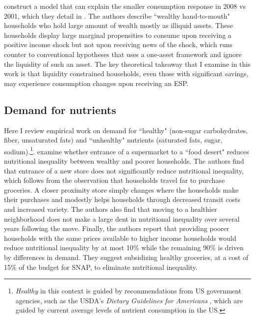\documentclass[12pt]{article}
\begin{document}
\textcite{kaplan2014model} construct a model that can explain the smaller consumption response in 2008 vs 2001, which they detail in \textcite{kaplan2014tale}. The authors describe ``wealthy hand-to-mouth" households who hold large amount of wealth mostly as illiquid assets. These households display large marginal propensities to consume upon receiving a positive income shock but not upon receiving news of the shock, which runs counter to conventional hypotheses that uses a one-asset framework and ignore the liquidity of such an asset. The key theoretical takeaway that I examine in this work is that liquidity constrained households, even those with significant savings, may experience consumption changes upon receiving an ESP.

\subsection{Demand for nutrients}

Here I review empirical work on demand for ``healthy" (non-sugar carbohydrates, fiber, unsaturated fats) and ``unhealthy" nutrients (saturated fats, sugar, sodium).\footnote{\textit{Healthy} in this context is guided by recommendations from US government agencies, such as the USDA's \textit{Dietary Guidelines for Americans} \citeyear{usda2021}, which are guided by current average levels of nutrient consumption in the US.}. \textcite{allcott2019food} examine whether entrance of a supermarket to a ``food desert" reduces nutritional inequality between wealthy and poorer households. The authors find that entrance of a new store does not significantly reduce nutritional inequality, which follows from the observation that households travel far to purchase groceries. A closer proximity store simply changes where the households make their purchases and modestly helps households through decreased transit costs and increased variety. The authors also find that moving to a healthier neighborhood does not make a large dent in nutritional inequality over several years following the move. Finally, the authors report that providing poorer households with the same prices available to higher income households would reduce nutritional inequality by at most 10\% while the remaining 90\% is driven by differences in demand. They suggest subsidizing healthy groceries, at a cost of 15\% of the budget for SNAP, to eliminate nutritional inequality.
\end{document}
